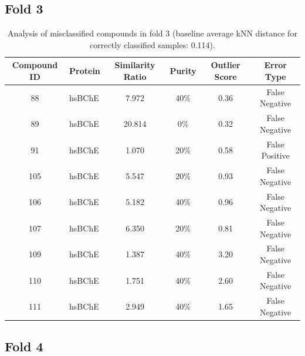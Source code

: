 \documentclass{article}
\newenvironment{smarttabular}[1]{%
    \begin{tabular}{#1}%
}{%
    \end{tabular}%
}
\begin{document}
\clearpage

\subsection{Fold 3}

\begin{table}[H]
    \centering
    \small
    \caption{Analysis of misclassified compounds in fold 3 (baseline average kNN distance for correctly classified samples: 0.114).}
    \label{tab:misclassified_compounds_3}
    \begin{smarttabular}{clcccc}
        \toprule
        \textbf{Compound ID} & \textbf{Protein} & \textbf{Similarity Ratio} & \textbf{Purity} & \textbf{Outlier Score} & \textbf{Error Type} \\
        \midrule
        88 & hsBChE & 7.972 & 40\% & 0.36 & False Negative \\
        89 & hsBChE & 20.814 & 0\% & 0.32 & False Negative \\
        91 & hsBChE & 1.070 & 20\% & 0.58 & False Positive \\
        105 & hsBChE & 5.547 & 20\% & 0.93 & False Negative \\
        106 & hsBChE & 5.182 & 40\% & 0.96 & False Negative \\
        107 & hsBChE & 6.350 & 20\% & 0.81 & False Negative \\
        109 & hsBChE & 1.387 & 40\% & 3.20 & False Negative \\
        110 & hsBChE & 1.751 & 40\% & 2.60 & False Negative \\
        111 & hsBChE & 2.949 & 40\% & 1.65 & False Negative \\
        \bottomrule
    \end{smarttabular}
\end{table}

\clearpage

\subsection{Fold 4}
\end{document}
